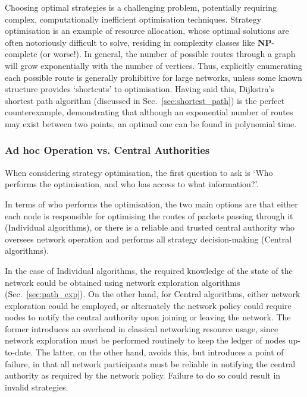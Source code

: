 \documentclass[aps,rmp,twocolumn,amsmath,amssymb,nofootinbib,superscriptaddress]{revtex4}
\begin{document}
Choosing optimal strategies is a challenging problem, potentially requiring complex, computationally inefficient optimisation techniques. Strategy optimisation is an example of resource allocation, whose optimal solutions are often notoriously difficult to solve, residing in complexity classes like \textbf{NP}-complete (or worse!). In general, the number of possible routes through a graph will grow exponentially with the number of vertices. Thus, explicitly enumerating each possible route is generally prohibitive for large networks, unless some known structure provides `shortcuts' to optimisation. Having said this, Dijkstra's shortest path algorithm (discussed in Sec.~\ref{sec:shortest_path}) is the perfect counterexample, demonstrating that although an exponential number of routes may exist between two points, an optimal one can be found in polynomial time.

%
%

\subsubsection{Ad hoc Operation vs. Central Authorities}

When considering strategy optimisation, the first question to ask is `Who performs the optimisation, and who has access to what information?'.

In terms of who performs the optimisation, the two main options are that either each node is responsible for optimising the routes of packets passing through it ({\sc Individual} algorithms), or there is a reliable and trusted central authority who oversees network operation and performs all strategy decision-making ({\sc Central} algorithms).

In the case of {\sc Individual} algorithms, the required knowledge of the state of the network could be obtained using network exploration algorithms (Sec.~\ref{sec:path_exp}). On the other hand, for {\sc Central} algorithms, either network exploration could be employed, or alternately the network policy could require nodes to notify the central authority upon joining or leaving the network. The former introduces an overhead in classical networking resource usage, since network exploration must be performed routinely to keep the ledger of nodes up-to-date. The latter, on the other hand, avoids this, but introduces a point of failure, in that all network participants must be reliable in notifying the central authority as required by the network policy. Failure to do so could result in invalid strategies.
\end{document}
